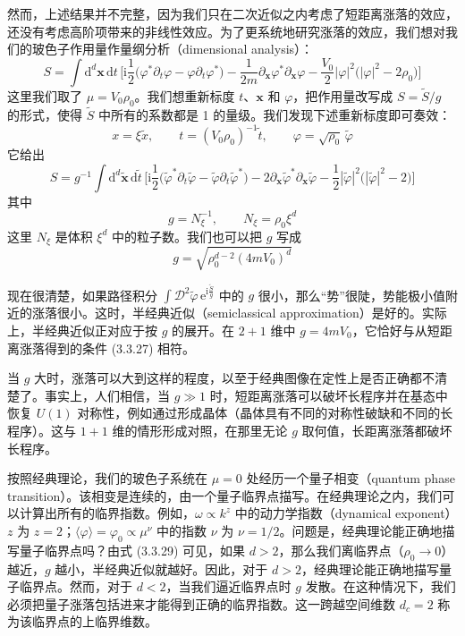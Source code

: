 然而，上述结果并不完整，因为我们只在二次近似之内考虑了短距离涨落的效应，还没有考虑高阶项带来的非线性效应。为了更系统地研究涨落的效应，我们想对我们的玻色子作用量作量纲分析（dimensional analysis）：
\begin{equation*}
S=\int\mathrm{d}^d\pmb{x}\,\mathrm{d}t\,\Big[\mathrm{i}\frac{1}{2}\big(\varphi^*\partial_t\varphi-\varphi\partial_t\varphi^*\big)-\frac{1}{2m}\partial_{\pmb{x}}\varphi^*\partial_{\pmb{x}}\varphi-\frac{V_0}{2}|\varphi|^2\big(|\varphi|^2-2\rho_0\big)\Big] \tag{3.3.28}
\end{equation*}
这里我们取了 $\mu=V_0\rho_0$。我们想重新标度 $t$、$\pmb{x}$ 和 $\varphi$，把作用量改写成 $S=\tilde{S}/g$ 的形式，使得 $\tilde{S}$ 中所有的系数都是 1 的量级。我们发现下述重新标度即可奏效：
\begin{equation*}
x=\xi\tilde{x},\qquad t=(V_0\rho_0)^{-1}\tilde{t},\qquad\varphi=\sqrt{\rho_0}\,\tilde{\varphi}
\end{equation*}
它给出
\begin{equation*}
S=g^{-1}\int\mathrm{d}^d\tilde{\pmb{x}}\,\mathrm{d}\tilde{t}\,\Big[\mathrm{i}\frac{1}{2}\big(\tilde{\varphi}^*\partial_t\tilde{\varphi}-\tilde{\varphi}\partial_t\tilde{\varphi}^*\big)-2\partial_{\pmb{x}}\tilde{\varphi}^*\partial_{\pmb{x}}\tilde{\varphi}-\frac{1}{2}|\tilde{\varphi}|^2\big(|\tilde{\varphi}|^2-2\big)\Big]
\end{equation*}
其中
\begin{equation*}
g=N_{\xi}^{-1},\qquad N_{\xi}=\rho_0\xi^d
\end{equation*}
这里 $N_{\xi}$ 是体积 $\xi^d$ 中的粒子数。我们也可以把 $g$ 写成
\begin{equation*}
g=\sqrt{\rho_0^{d-2}(4mV_0)^d} \tag{3.3.29}
\end{equation*}

现在很清楚，如果路径积分 $\int\mathcal{D}^2\tilde{\varphi}\,\mathrm{e}^{\mathrm{i}\frac{\tilde{S}}{g}}$ 中的 $g$ 很小，那么“势”很陡，势能极小值附近的涨落很小。这时，半经典近似（semiclassical approximation）是好的。实际上，半经典近似正对应于按 $g$ 的展开。在 $2+1$ 维中 $g=4mV_0$，它恰好与从短距离涨落得到的条件 (3.3.27) 相符。

当 $g$ 大时，涨落可以大到这样的程度，以至于经典图像在定性上是否正确都不清楚了。事实上，人们相信，当 $g\gg1$ 时，短距离涨落可以破坏长程序并在基态中恢复 $U(1)$ 对称性，例如通过形成晶体（晶体具有不同的对称性破缺和不同的长程序）。这与 $1+1$ 维的情形形成对照，在那里无论 $g$ 取何值，长距离涨落都破坏长程序。

按照经典理论，我们的玻色子系统在 $\mu=0$ 处经历一个量子相变（quantum phase transition）。该相变是连续的，由一个量子临界点描写。在经典理论之内，我们可以计算出所有的临界指数。例如，$\omega\propto k^z$ 中的动力学指数（dynamical exponent）$z$ 为 $z=2$；$\langle\varphi\rangle=\varphi_0\propto\mu^{\nu}$ 中的指数 $\nu$ 为 $\nu=1/2$。问题是，经典理论能正确地描写量子临界点吗？由式 (3.3.29) 可见，如果 $d>2$，那么我们离临界点（$\rho_0\to0$）越近，$g$ 越小，半经典近似就越好。因此，对于 $d>2$，经典理论能正确地描写量子临界点。然而，对于 $d<2$，当我们逼近临界点时 $g$ 发散。在这种情况下，我们必须把量子涨落包括进来才能得到正确的临界指数。这一跨越空间维数 $d_c=2$ 称为该临界点的上临界维数。

